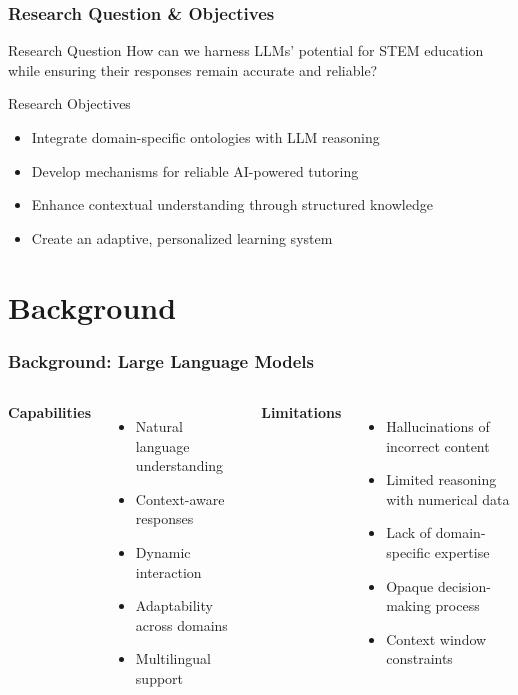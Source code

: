 \documentclass{beamer}
\begin{document}
\begin{frame}
\frametitle{Research Question \& Objectives}

\begin{alertblock}{Research Question}
How can we harness LLMs' potential for STEM education while ensuring their responses remain accurate and reliable?
\end{alertblock}
\pause

\begin{block}{Research Objectives}
\begin{itemize}
    \item Integrate domain-specific ontologies with LLM reasoning
    \item Develop mechanisms for reliable AI-powered tutoring
    \item Enhance contextual understanding through structured knowledge
    \item Create an adaptive, personalized learning system
\end{itemize}
\end{block}
\end{frame}

\section{Background}

\begin{frame}
\frametitle{Background: Large Language Models}

\begin{columns}

\textbf{Capabilities}
\begin{itemize}
    \item Natural language understanding
    \item Context-aware responses
    \item Dynamic interaction
    \item Adaptability across domains
    \item Multilingual support
\end{itemize}

\textbf{Limitations}
\begin{itemize}
    \item \alert{Hallucinations} of incorrect content
    \item Limited reasoning with numerical data
    \item Lack of domain-specific expertise
    \item Opaque decision-making process
    \item Context window constraints
\end{itemize}

\end{columns}
\end{frame}
\end{document}
